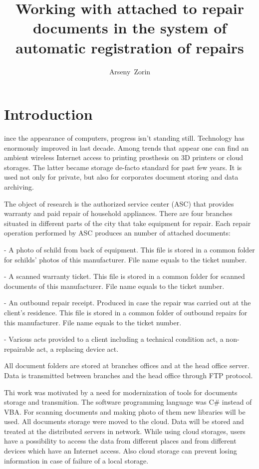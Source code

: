 \documentclass[12pt,journal,compsoc]{D:/Магистратура/English/bare_conf/IEEEtran}
\begin{document}
\title{Working with attached to repair documents in the system of automatic registration of repairs}

\author{Arseny~Zorin}
\maketitle

\IEEEpeerreviewmaketitle



\section{Introduction}
ince the appearance of computers, progress isn't standing still. Technology has enormously improved in last decade. Among trends that appear one can find an ambient wireless Internet access to printing prosthesis on 3D printers or cloud storages. The latter became storage de-facto standard for past few years. It is used not only for private, but also for corporates document storing and data archiving.

The object of research is the authorized service center (ASC) that provides warranty and paid repair of household appliances. There are four branches situated in different parts of the city that take equipment for repair. Each repair operation performed by ASC produces an number of attached documents:

- A photo of schild from back of equipment. This file is stored in a common folder for schilds' photos of this manufacturer. File name equals to the ticket number.

- A scanned warranty ticket. This file is stored in a common folder for scanned documents of this manufacturer. File name equals to the ticket number.

- An outbound repair receipt. Produced in case the repair was carried out at the client's residence. This file is stored in a common folder of outbound repairs for this manufacturer. File name equals to the ticket number.

- Various acts provided to a client including a technical condition act, a non-repairable act, a replacing device act.

All document folders are stored at branches offices and at the head office server. Data is transmitted between branches and the head office through FTP protocol.

Thi work was motivated by a need for modernization of tools for documents storage and transmition. The software programming language was C\# instead of VBA. For scanning documents and making photo of them new libraries will be used. All documents storage were moved to the cloud. Data will be stored and treated at the distributed servers in network. While using cloud storages, users have a possibility to access the data from different places and from different devices which have an Internet access. Also cloud storage can prevent losing information in case of failure of a local storage.
\end{document}
